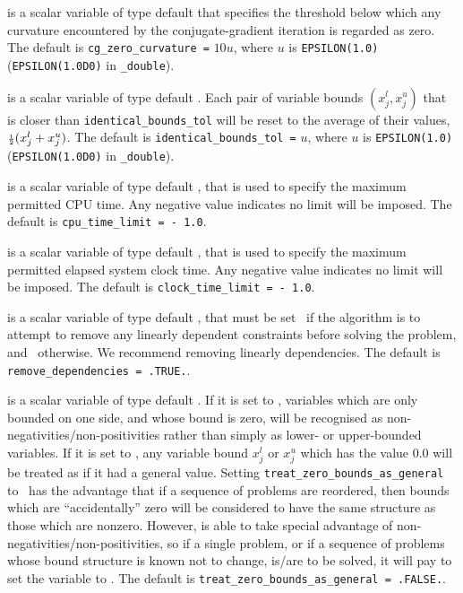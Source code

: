 \begin{description}
 is a scalar variable of type default \realdp
that specifies the threshold below which any curvature
encountered by the conjugate-gradient iteration is regarded as zero.
The default is {\tt cg\_zero\_curvature =} $10 u$,
where $u$ is {\tt EPSILON(1.0)} ({\tt EPSILON(1.0D0)} in
{\tt \fullpackagename\_double}).

is a scalar variable of type default \realdp.
Each pair of variable bounds $(x_{j}^{l}, x_{j}^{u})$
that is closer than {\tt identical\_bounds\_tol}
will be reset to the average of their values,
${\scriptstyle \frac{1}{2}} (x_{j}^{l} + x_{j}^{u})$.
The default is {\tt identical\_bounds\_tol =} $u$,
where $u$ is {\tt EPSILON(1.0)} ({\tt EPSILON(1.0D0)} in
{\tt \fullpackagename\_double}).

 is a scalar variable of type default \realdp,
that is used to specify the maximum permitted CPU time. Any negative
value indicates no limit will be imposed. The default is
{\tt cpu\_time\_limit = - 1.0}.

 is a scalar variable of type default \realdp,
that is used to specify the maximum permitted elapsed system clock time.
Any negative value indicates no limit will be imposed. The default is
{\tt clock\_time\_limit = - 1.0}.

 is a scalar variable of type
default \logical, that must be set \true\ if the algorithm
is to attempt to remove any linearly dependent constraints before
solving the problem, and \false\ otherwise.
We recommend removing linearly dependencies.
The default is {\tt remove\_dependencies = .TRUE.}.

 is a scalar variable of type
default \logical.
If it is set to \false, variables which
are only bounded on one side, and whose bound is zero,
will be recognised as non-negativities/non-positivities rather than simply as
lower- or upper-bounded variables.
If it is set to \true, any variable bound
$x_{j}^{l}$ or $x_{j}^{u}$ which has the value 0.0 will be
treated as if it had a general value.
Setting {\tt treat\_zero\_bounds\_as\_general} to \true\ has the advantage
that if a sequence of problems are reordered, then bounds which are
``accidentally'' zero will be considered to have the same structure as
those which are nonzero. However, {\tt \fullpackagename} is
able to take special advantage of non-negativities/non-positivities, so
if a single problem, or if a sequence of problems whose
bound structure is known not to change, is/are to be solved,
it will pay to set the variable to \false.
The default is {\tt treat\_zero\_bounds\_as\_general = .FALSE.}.


\end{description}

